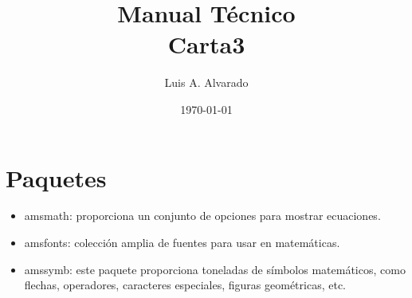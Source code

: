 \documentclass[12pt]{article}
\title{Manual Técnico \\ Carta3}
\author{Luis A. Alvarado}
\date{\today}
\begin{document}
\maketitle{}

\tableofcontents

\clearpage
\newpage

\section{Paquetes}
\begin{itemize}
	\item amsmath\cite{amsmath}: proporciona un conjunto de opciones para mostrar ecuaciones.
	\item amsfonts\cite{amsfonts}: colección amplia de fuentes para usar en matemáticas.
	\item amssymb\cite{amssymb}: este paquete proporciona toneladas de símbolos matemáticos, como flechas, operadores, caracteres especiales, figuras geométricas, etc.
\end{itemize}


\end{document}
